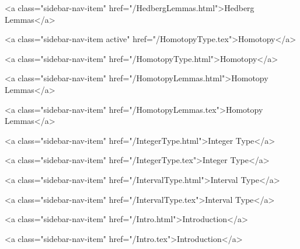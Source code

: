       
        
          <a class="sidebar-nav-item" href="/HedbergLemmas.html">Hedberg Lemmas</a>
        
      
    
      
        
          <a class="sidebar-nav-item active" href="/HomotopyType.tex">Homotopy</a>
        
      
    
      
        
          <a class="sidebar-nav-item" href="/HomotopyType.html">Homotopy</a>
        
      
    
      
        
          <a class="sidebar-nav-item" href="/HomotopyLemmas.html">Homotopy Lemmas</a>
        
      
    
      
        
          <a class="sidebar-nav-item" href="/HomotopyLemmas.tex">Homotopy Lemmas</a>
        
      
    
      
        
          <a class="sidebar-nav-item" href="/IntegerType.html">Integer Type</a>
        
      
    
      
        
          <a class="sidebar-nav-item" href="/IntegerType.tex">Integer Type</a>
        
      
    
      
        
          <a class="sidebar-nav-item" href="/IntervalType.html">Interval Type</a>
        
      
    
      
        
          <a class="sidebar-nav-item" href="/IntervalType.tex">Interval Type</a>
        
      
    
      
        
          <a class="sidebar-nav-item" href="/Intro.html">Introduction</a>
        
      
    
      
        
          <a class="sidebar-nav-item" href="/Intro.tex">Introduction</a>
        
      
    
